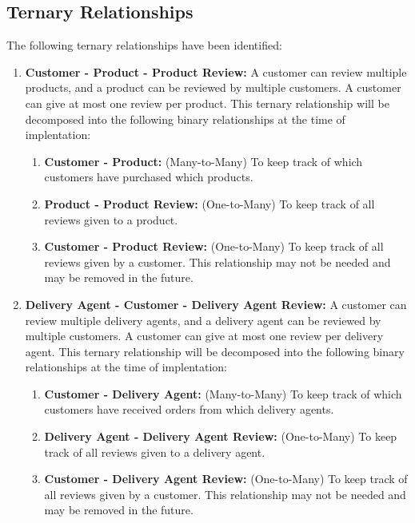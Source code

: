 \documentclass[12pt]{report}
\begin{document}
    \subsection*{Ternary Relationships}
    The following ternary relationships have been identified:
    \begin{enumerate}
        \item \textbf{Customer - Product - Product Review:}
        A customer can review multiple products, and a product can be reviewed by multiple customers.
        A customer can give at most one review per product.
        This ternary relationship will be decomposed into the following binary relationships at the time of implentation:
        \begin{enumerate}
            \item \textbf{Customer - Product:}
            (Many-to-Many) To keep track of which customers have purchased which products.
            \item \textbf{Product - Product Review:}
            (One-to-Many) To keep track of all reviews given to a product.
            \item \textbf{Customer - Product Review:}
            (One-to-Many) To keep track of all reviews given by a customer.
            This relationship may not be needed and may be removed in the future.
        \end{enumerate}
        \item \textbf{Delivery Agent - Customer - Delivery Agent Review:}
        A customer can review multiple delivery agents, and a delivery agent can be reviewed by multiple customers.
        A customer can give at most one review per delivery agent.
        This ternary relationship will be decomposed into the following binary relationships at the time of implentation:
        \begin{enumerate}
            \item \textbf{Customer - Delivery Agent:}
            (Many-to-Many) To keep track of which customers have received orders from which delivery agents.
            \item \textbf{Delivery Agent - Delivery Agent Review:}
            (One-to-Many) To keep track of all reviews given to a delivery agent.
            \item \textbf{Customer - Delivery Agent Review:}
            (One-to-Many) To keep track of all reviews given by a customer.
            This relationship may not be needed and may be removed in the future.
        \end{enumerate}
    \end{enumerate}
\end{document}
